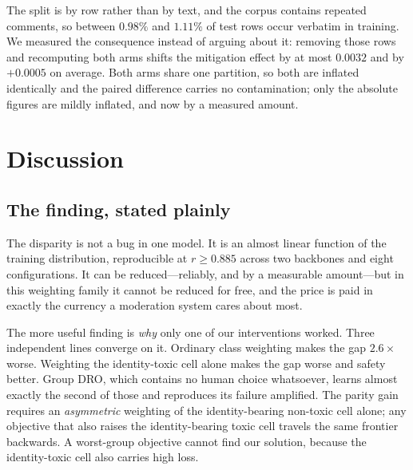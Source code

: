 \documentclass[conference]{IEEEtran}
\begin{document}
The split is by row rather than by text, and the corpus contains repeated
comments, so between $0.98\%$ and $1.11\%$ of test rows occur verbatim in
training. We measured the consequence instead of arguing about it: removing those
rows and recomputing both arms shifts the mitigation effect by at most $0.0032$
and by $+0.0005$ on average. Both arms share one partition, so both are inflated
identically and the paired difference carries no contamination; only the absolute
figures are mildly inflated, and now by a measured amount.

\begin{table}[t]
\caption{Per-seed integrity checks over all $38$ runs. A single split fingerprint
per seed is what makes the configurations comparable with each other and not only
each with its own baseline.}
\label{tab:integrity}
\centering
\small

\end{table}

\section{Discussion}

\subsection{The finding, stated plainly}
The disparity is not a bug in one model. It is an almost linear function of the
training distribution, reproducible at $r \geq 0.885$ across two backbones and
eight configurations. It can be reduced---reliably, and by a measurable
amount---but in this weighting family it cannot be reduced for free, and the
price is paid in exactly the currency a moderation system cares about most.

The more useful finding is \emph{why} only one of our interventions worked. Three
independent lines converge on it. Ordinary class weighting makes the gap
$2.6\times$ worse. Weighting the identity-toxic cell alone makes the gap worse
and safety better. Group DRO, which contains no human choice whatsoever, learns
almost exactly the second of those and reproduces its failure amplified. The
parity gain requires an \emph{asymmetric} weighting of the identity-bearing
non-toxic cell alone; any objective that also raises the identity-bearing toxic
cell travels the same frontier backwards. A worst-group objective cannot find our
solution, because the identity-toxic cell also carries high loss.
\end{document}
